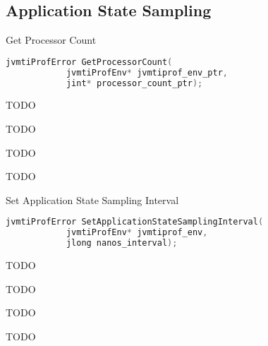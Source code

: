 
\subsection{Application State Sampling}

\begin{apidef}{Get Processor Count}
\begin{lstlisting}[language=C]
jvmtiProfError GetProcessorCount(
            jvmtiProfEnv* jvmtiprof_env_ptr,
            jint* processor_count_ptr);
\end{lstlisting}

\begin{apidesc}
TODO
\end{apidesc}

\begin{apiphase}
TODO
\end{apiphase}

\begin{apicap}
TODO
\end{apicap}

\begin{apiparam}
\end{apiparam}

\begin{apireturn}
TODO
\end{apireturn}

\begin{apierror}
\end{apierror}
\end{apidef}
\begin{apidef}{Set Application State Sampling Interval}
\begin{lstlisting}[language=C]
jvmtiProfError SetApplicationStateSamplingInterval(
            jvmtiProfEnv* jvmtiprof_env,
            jlong nanos_interval);
\end{lstlisting}

\begin{apidesc}
TODO
\end{apidesc}

\begin{apiphase}
TODO
\end{apiphase}

\begin{apicap}
TODO
\end{apicap}

\begin{apiparam}
\end{apiparam}

\begin{apireturn}
TODO
\end{apireturn}

\begin{apierror}
\end{apierror}
\end{apidef}
